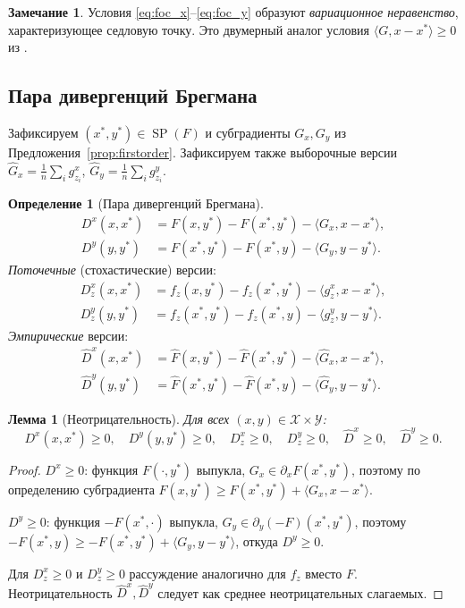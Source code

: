 \documentclass[12pt,a4paper]{article}
\theoremstyle{plain}
\newtheorem{lemma}[theorem]{Лемма}
\theoremstyle{definition}
\newtheorem{definition}[theorem]{Определение}
\newtheorem{remark}[theorem]{Замечание}
\DeclareMathOperator{\SP}{SP}
\newcommand{\cX}{\mathcal{X}}
\newcommand{\cY}{\mathcal{Y}}
\newcommand{\hatF}{\hat{F}}
\newcommand{\hatD}{\hat{D}}
\newcommand{\hatG}{\hat{G}}
\begin{document}
\begin{remark}
Условия \eqref{eq:foc_x}--\eqref{eq:foc_y} образуют \emph{вариационное неравенство}, характеризующее седловую точку. Это двумерный аналог условия $\langle G,x-x^*\rangle\ge 0$ из \cite{CLY2023}.
\end{remark}

\subsection{Пара дивергенций Брегмана}

Зафиксируем $(x^*,y^*)\in\SP(F)$ и субградиенты $G_x,G_y$ из Предложения~\ref{prop:firstorder}. Зафиксируем также выборочные версии $\hatG_x=\frac{1}{n}\sum_i g_{z_i}^x$, $\hatG_y=\frac{1}{n}\sum_i g_{z_i}^y$.

\begin{definition}[Пара дивергенций Брегмана]
\label{def:bregman}
\begin{align*}
    D^x(x,x^*)&=F(x,y^*)-F(x^*,y^*)-\langle G_x,x-x^*\rangle,\\
    D^y(y,y^*)&=F(x^*,y^*)-F(x^*,y)-\langle G_y,y-y^*\rangle.
\end{align*}
\emph{Поточечные} (стохастические) версии:
\begin{align*}
    D_z^x(x,x^*)&=f_z(x,y^*)-f_z(x^*,y^*)-\langle g_z^x,x-x^*\rangle,\\
    D_z^y(y,y^*)&=f_z(x^*,y^*)-f_z(x^*,y)-\langle g_z^y,y-y^*\rangle.
\end{align*}
\emph{Эмпирические} версии:
\begin{align*}
    \hatD^x(x,x^*)&=\hatF(x,y^*)-\hatF(x^*,y^*)-\langle\hatG_x,x-x^*\rangle,\\
    \hatD^y(y,y^*)&=\hatF(x^*,y^*)-\hatF(x^*,y)-\langle\hatG_y,y-y^*\rangle.
\end{align*}
\end{definition}

\begin{lemma}[Неотрицательность]
\label{lem:nonneg}
Для всех $(x,y)\in\cX\times\cY$:
\[
    D^x(x,x^*)\ge 0,\quad D^y(y,y^*)\ge 0,\quad D_z^x\ge 0,\quad D_z^y\ge 0,\quad \hatD^x\ge 0,\quad \hatD^y\ge 0.
\]
\end{lemma}

\begin{proof}
$D^x\ge 0$: функция $F(\cdot,y^*)$ выпукла, $G_x\in\partial_x F(x^*,y^*)$, поэтому по определению субградиента $F(x,y^*)\ge F(x^*,y^*)+\langle G_x,x-x^*\rangle$.

$D^y\ge 0$: функция $-F(x^*,\cdot)$ выпукла, $G_y\in\partial_y(-F)(x^*,y^*)$, поэтому $-F(x^*,y)\ge-F(x^*,y^*)+\langle G_y,y-y^*\rangle$, откуда $D^y\ge 0$.

Для $D_z^x\ge 0$ и $D_z^y\ge 0$ рассуждение аналогично для $f_z$ вместо $F$. Неотрицательность $\hatD^x,\hatD^y$ следует как среднее неотрицательных слагаемых.
\end{proof}
\end{document}
